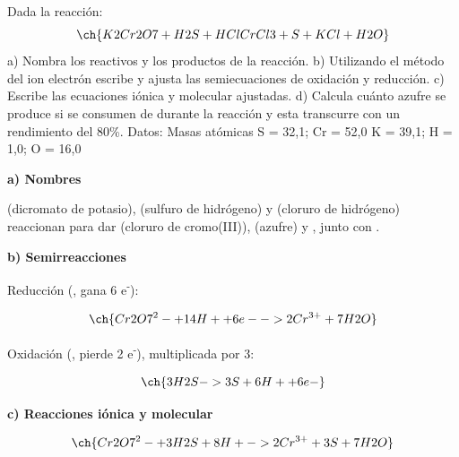 \begin{exerciseEVAU}
    Dada la reacción:
    \begin{equation*}
        \ch{K2Cr2O7 + H2S + HCl CrCl3 + S + KCl + H2O}
    \end{equation*}
    a) Nombra los reactivos y los productos de la reacción. b) Utilizando el método del ion electrón escribe y ajusta las semiecuaciones de oxidación y reducción. c) Escribe las ecuaciones iónica y molecular ajustadas. d) Calcula cuánto azufre se produce si se consumen  de  durante la reacción y esta transcurre con un rendimiento del 80\%. Datos: Masas atómicas S = 32,1; Cr = 52,0 K = 39,1; H = 1,0; O = 16,0

    \begin{solu}


        \textbf{a) Nombres}

         (dicromato de potasio),  (sulfuro de hidrógeno) y  (cloruro de hidrógeno) reaccionan para dar  (cloruro de cromo(III)),  (azufre) y , junto con .

        \textbf{b) Semirreacciones}

        Reducción (, gana 6 e\textsuperscript{-}):

        \begin{equation*}
            \ch{Cr2O7^2- + 14 H+ + 6 e- -> 2 Cr^{3+} + 7 H2O}
        \end{equation*}

        Oxidación (, pierde 2 e\textsuperscript{-}), multiplicada por 3:

        \begin{equation*}
            \ch{3 H2S -> 3 S + 6 H+ + 6 e-}
        \end{equation*}

        \textbf{c) Reacciones iónica y molecular}

        \begin{equation*}
            \ch{Cr2O7^2- + 3 H2S + 8 H+ -> 2 Cr^{3+} + 3 S + 7 H2O}
        \end{equation*}


\end{solu}
\end{exerciseEVAU}
